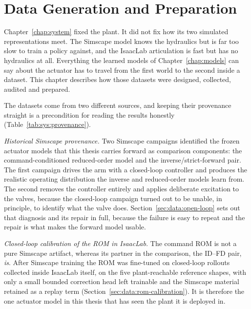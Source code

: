 \chapter{Data Generation and Preparation}
\label{chap:data}

Chapter~\ref{chap:system} fixed the plant. It did not fix how its two
simulated representations meet. The Simscape model knows the hydraulics but is
far too slow to train a policy against, and the IsaacLab articulation is fast
but has no hydraulics at all. Everything the learned models of
Chapter~\ref{chap:models} can say about the actuator has to travel from the
first world to the second inside a dataset. This chapter describes how those
datasets were designed, collected, audited and prepared.

The datasets come from two different sources, and keeping their provenance
straight is a precondition for reading the results honestly
(Table~\ref{tab:sys:provenance}).

\emph{Historical Simscape provenance.} Two Simscape campaigns identified
the frozen actuator models that this thesis carries forward as
comparison components: the command-conditioned reduced-order model and
the inverse/strict-forward pair. The first campaign drives the arm with
a closed-loop controller and produces the realistic operating
distribution the inverse and reduced-order models learn from. The second
removes the controller entirely and applies deliberate excitation to the
valves, because the closed-loop campaign turned out to be unable, in
principle, to identify what the valve does. Section~\ref{sec:data:open-loop} sets out that diagnosis and its repair in
full, because the failure is easy to repeat and the repair is what makes the
forward model usable.

\emph{Closed-loop calibration of the ROM in IsaacLab.} The command ROM is not a pure Simscape artifact, whereas its partner in
the comparison, the ID--FD pair, \emph{is}. After
Simscape training the ROM was fine-tuned on closed-loop rollouts
collected inside IsaacLab itself, on the five plant-reachable reference
shapes, with only a small bounded correction head left trainable and the
Simscape material retained as a replay term
(Section~\ref{sec:data:rom-calibration}). It is therefore the one
actuator model in this thesis that has seen the plant it is deployed in.

